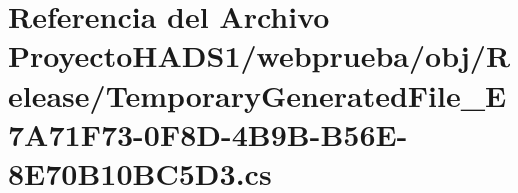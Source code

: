 \hypertarget{_proyecto_h_a_d_s1_2webprueba_2obj_2_release_2_temporary_generated_file___e7_a71_f73-0_f8_d-4_b9_b-_b56_e-8_e70_b10_b_c5_d3_8cs}{}\section{Referencia del Archivo Proyecto\+H\+A\+D\+S1/webprueba/obj/\+Release/\+Temporary\+Generated\+File\+\_\+\+E7\+A71\+F73-\/0\+F8\+D-\/4\+B9\+B-\/\+B56\+E-\/8\+E70\+B10\+B\+C5\+D3.cs}
\label{_proyecto_h_a_d_s1_2webprueba_2obj_2_release_2_temporary_generated_file___e7_a71_f73-0_f8_d-4_b9_b-_b56_e-8_e70_b10_b_c5_d3_8cs}
